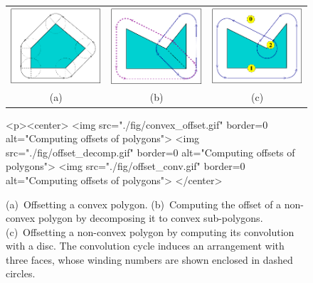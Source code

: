 \begin{figure}[t]
\begin{ccTexOnly}
\begin{center}
  \begin{tabular}{ccc}
    \includegraphics{Minkowski_sum_2/fig/convex_offset} &
    \includegraphics{Minkowski_sum_2/fig/offset_decomp} &
    \includegraphics{Minkowski_sum_2/fig/offset_conv} \\
    {\small (a)} & {\small (b)} & {\small (c)}
  \end{tabular}
\end{center}
\end{ccTexOnly}
\begin{ccHtmlOnly}
  <p><center>
  <img src="./fig/convex_offset.gif" border=0 alt="Computing offsets of polygons">
  <img src="./fig/offset_decomp.gif" border=0 alt="Computing offsets of polygons">
  <img src="./fig/offset_conv.gif" border=0 alt="Computing offsets of polygons">
  </center>
\end{ccHtmlOnly}
\caption{(a)~Offsetting a convex polygon.
(b)~Computing the offset of a non-convex polygon by decomposing
it to convex sub-polygons. (c)~Offsetting a non-convex polygon
by computing its convolution with a disc. The convolution cycle
induces an arrangement with three faces, whose winding numbers
are shown enclosed in dashed circles.}
\label{mink_fig:pgn_offset}
\end{figure}

